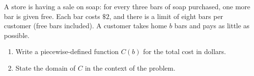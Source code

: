 A store is having a sale on soap: for every three bars of soap purchased, one more bar is given free. Each bar costs $\$2$, and there is a limit of eight bars per customer (free bars included). A customer takes home $b$ bars and pays as little as possible.
\begin{enumerate}
\item Write a piecewise-defined function $C(b)$ for the total cost in dollars.
\item State the domain of $C$ in the context of the problem.
\end{enumerate}
